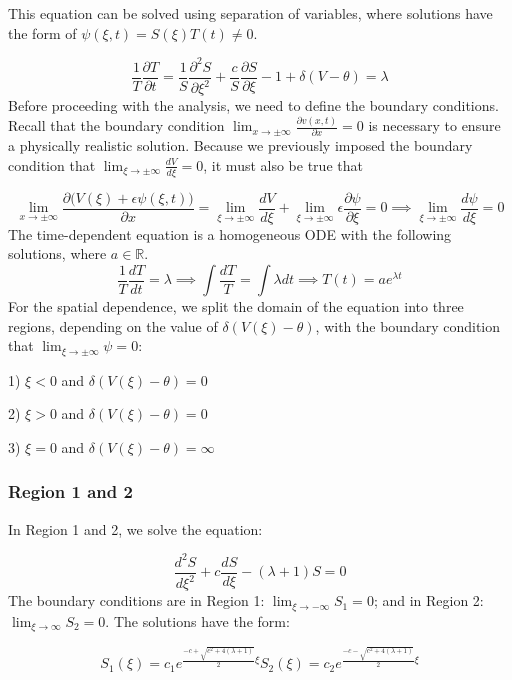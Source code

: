 \documentclass[12pt]{article}
\begin{document}
This equation can be solved using separation of variables, where solutions have the form of $\psi(\xi,t)=S(\xi)T(t)\neq0$.

$$ \frac{1}{T}\frac{\partial T}{\partial t} = \frac{1}{S}\frac{\partial^2S}{\partial\xi^2} + \frac{c}{S}\frac{\partial S}{\partial\xi} - 1 + \delta(V-\theta)= \lambda $$
Before proceeding with the analysis, we need to define the boundary conditions. Recall that the boundary condition $\lim_{x\to\pm\infty} \frac{\partial v(x,t)}{\partial x}=0$ is necessary to ensure a physically realistic solution. Because we previously imposed the boundary condition that $\lim_{\xi\to\pm\infty} \frac{dV}{d\xi}=0$, it must also be true that 

$$\lim_{x\to\pm\infty} \frac{\partial \big(V(\xi)+\epsilon\psi(\xi,t)\big)}{\partial x} = \lim_{\xi\to\pm\infty} \frac{dV}{d\xi}+\lim_{\xi\to\pm\infty} \epsilon\frac{\partial\psi}{\partial\xi}=0 \implies \lim_{\xi\to\pm\infty}\frac{d\psi}{d\xi}=0 $$
The time-dependent equation is a homogeneous ODE with the following solutions, where $a\in\mathbb{R}$.
\begin{equation} \label{timeeq}
\frac{1}{T}\frac{dT}{dt} = \lambda \implies \int\frac{dT}{T} = \int\lambda dt \implies T(t)=ae^{\lambda t}
\end{equation}
For the spatial dependence, we split the domain of the equation into three regions, depending on the value of $\delta(V(\xi)-\theta)$, with the boundary condition that $\lim_{\xi \to \pm \infty}\psi = 0$:

1) $\xi < 0$ and $\delta(V(\xi)-\theta) = 0$

2) $\xi > 0$ and $\delta(V(\xi)-\theta) = 0$ 

3) $\xi = 0$ and $\delta(V(\xi)-\theta) = \infty$

\subsubsection{ Region 1 and 2}
In Region 1 and 2, we solve the equation:

\begin{equation}
\frac{d^2S}{d\xi^2} + c\frac{dS}{d\xi} - (\lambda + 1)S = 0
\end{equation} 
The boundary conditions are in Region 1: $\lim_{\xi \to -\infty}S_1 = 0$; and in Region 2: $\lim_{\xi \to \infty}S_2 = 0$. The solutions have the form:

\begin{equation} \label{homogsln}
S_1(\xi) = c_1e^{\frac{-c+\sqrt{c^2+4(\lambda+1)}}{2}\xi}
S_2(\xi) = c_2e^{\frac{-c-\sqrt{c^2+4(\lambda+1)}}{2}\xi} 
\end{equation}
\end{document}

